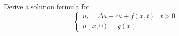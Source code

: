 Derive a solution formula for
$$
\begin{cases}
  u_t = \Delta u + c u + f(x, t) & t > 0\\
  u(x, 0) = g(x)
\end{cases}
$$
